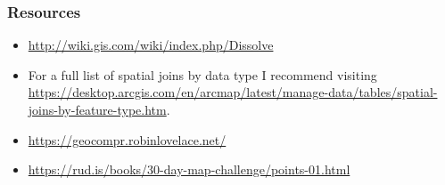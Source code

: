 \documentclass[
]{book}
\providecommand{\tightlist}{%
  \setlength{\itemsep}{0pt}\setlength{\parskip}{0pt}}
\begin{document}
\hypertarget{resources}{%
\subsubsection{Resources}\label{resources}}

\begin{itemize}
\tightlist
\item
  \url{http://wiki.gis.com/wiki/index.php/Dissolve}
\item
  For a full list of spatial joins by data type I recommend visiting \url{https://desktop.arcgis.com/en/arcmap/latest/manage-data/tables/spatial-joins-by-feature-type.htm}.
\item
  \url{https://geocompr.robinlovelace.net/}
\item
  \url{https://rud.is/books/30-day-map-challenge/points-01.html}
\end{itemize}

  
\end{document}
